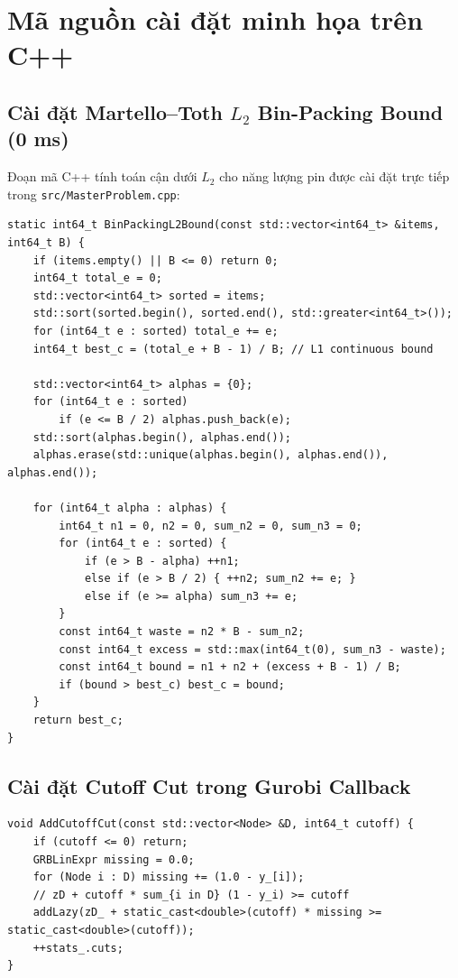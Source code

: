 \documentclass[12pt,a4paper]{article}
\begin{document}
\section{Mã nguồn cài đặt minh họa trên C++}
\label{sec:code-implementation}

\subsection{Cài đặt Martello--Toth $L_2$ Bin-Packing Bound (0 ms)}

Đoạn mã C++ tính toán cận dưới $L_2$ cho năng lượng pin được cài đặt trực tiếp trong \texttt{src/MasterProblem.cpp}:

\begin{verbatim}
static int64_t BinPackingL2Bound(const std::vector<int64_t> &items, int64_t B) {
    if (items.empty() || B <= 0) return 0;
    int64_t total_e = 0;
    std::vector<int64_t> sorted = items;
    std::sort(sorted.begin(), sorted.end(), std::greater<int64_t>());
    for (int64_t e : sorted) total_e += e;
    int64_t best_c = (total_e + B - 1) / B; // L1 continuous bound

    std::vector<int64_t> alphas = {0};
    for (int64_t e : sorted)
        if (e <= B / 2) alphas.push_back(e);
    std::sort(alphas.begin(), alphas.end());
    alphas.erase(std::unique(alphas.begin(), alphas.end()), alphas.end());

    for (int64_t alpha : alphas) {
        int64_t n1 = 0, n2 = 0, sum_n2 = 0, sum_n3 = 0;
        for (int64_t e : sorted) {
            if (e > B - alpha) ++n1;
            else if (e > B / 2) { ++n2; sum_n2 += e; }
            else if (e >= alpha) sum_n3 += e;
        }
        const int64_t waste = n2 * B - sum_n2;
        const int64_t excess = std::max(int64_t(0), sum_n3 - waste);
        const int64_t bound = n1 + n2 + (excess + B - 1) / B;
        if (bound > best_c) best_c = bound;
    }
    return best_c;
}
\end{verbatim}

\subsection{Cài đặt Cutoff Cut trong Gurobi Callback}

\begin{verbatim}
void AddCutoffCut(const std::vector<Node> &D, int64_t cutoff) {
    if (cutoff <= 0) return;
    GRBLinExpr missing = 0.0;
    for (Node i : D) missing += (1.0 - y_[i]);
    // zD + cutoff * sum_{i in D} (1 - y_i) >= cutoff
    addLazy(zD_ + static_cast<double>(cutoff) * missing >= static_cast<double>(cutoff));
    ++stats_.cuts;
}
\end{verbatim}
\end{document}
